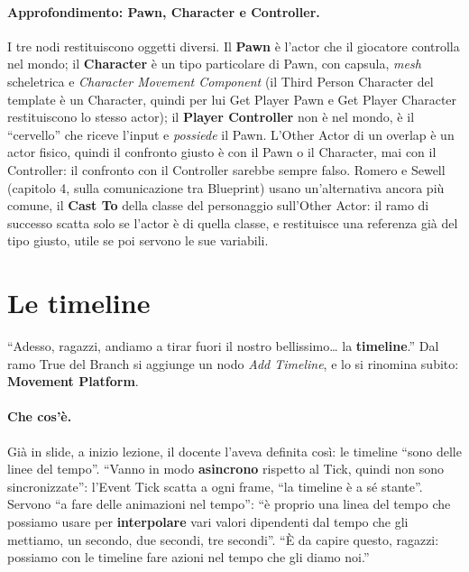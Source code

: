 \paragraph{Approfondimento: Pawn, Character e Controller.} I tre nodi restituiscono
oggetti diversi. Il \textbf{Pawn} è l'actor che il giocatore controlla nel mondo; il
\textbf{Character} è un tipo particolare di Pawn, con capsula, \emph{mesh} scheletrica e
\emph{Character Movement Component} (il Third Person Character del template è un
Character, quindi per lui Get Player Pawn e Get Player Character restituiscono lo stesso
actor); il \textbf{Player Controller} non è nel mondo, è il ``cervello'' che riceve
l'input e \emph{possiede} il Pawn. L'Other Actor di un overlap è un actor fisico, quindi
il confronto giusto è con il Pawn o il Character, mai con il Controller: il confronto
con il Controller sarebbe sempre falso. Romero e Sewell (capitolo 4, sulla comunicazione
tra Blueprint) usano un'alternativa ancora più comune, il \textbf{Cast To} della classe
del personaggio sull'Other Actor: il ramo di successo scatta solo se l'actor è di quella
classe, e restituisce una referenza già del tipo giusto, utile se poi servono le sue
variabili.

\section{Le timeline}
\label{ue6:sec:timeline}

``Adesso, ragazzi, andiamo a tirar fuori il nostro bellissimo\ldots{} la
\textbf{timeline}.'' Dal ramo True del Branch si aggiunge un nodo \emph{Add Timeline}, e
lo si rinomina subito: \textbf{Movement Platform}.

\paragraph{Che cos'è.} Già in slide, a inizio lezione, il docente l'aveva definita così:
le timeline ``sono delle linee del tempo''. ``Vanno in modo \textbf{asincrono} rispetto
al Tick, quindi non sono sincronizzate'': l'Event Tick scatta a ogni frame, ``la
timeline è a sé stante''. Servono ``a fare delle animazioni nel tempo'': ``è proprio una
linea del tempo che possiamo usare per \textbf{interpolare} vari valori dipendenti dal
tempo che gli mettiamo, un secondo, due secondi, tre secondi''. ``È da capire questo,
ragazzi: possiamo con le timeline fare azioni nel tempo che gli diamo noi.''

